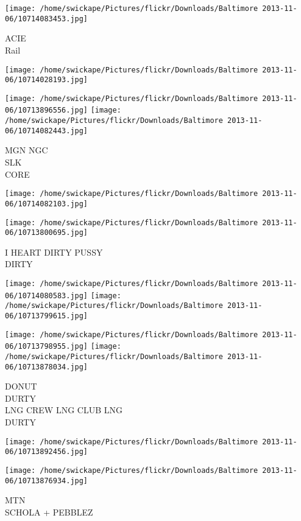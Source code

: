 \documentclass[10pt,letterpaper]{article}
\begin{document}
\vspace{0.25in}
\texttt{[image: /home/swickape/Pictures/flickr/Downloads/Baltimore 2013-11-06/10714083453.jpg]}

ACIE\\
Rail
\pagebreak

\texttt{[image: /home/swickape/Pictures/flickr/Downloads/Baltimore 2013-11-06/10714028193.jpg]}

\vspace{0.25in}
\texttt{[image: /home/swickape/Pictures/flickr/Downloads/Baltimore 2013-11-06/10713896556.jpg]}
\texttt{[image: /home/swickape/Pictures/flickr/Downloads/Baltimore 2013-11-06/10714082443.jpg]}

MGN NGC\\
SLK\\
CORE
\pagebreak

\texttt{[image: /home/swickape/Pictures/flickr/Downloads/Baltimore 2013-11-06/10714082103.jpg]}

\vspace{0.25in}
\texttt{[image: /home/swickape/Pictures/flickr/Downloads/Baltimore 2013-11-06/10713800695.jpg]}

I HEART DIRTY PUSSY\\
DIRTY
\pagebreak

\texttt{[image: /home/swickape/Pictures/flickr/Downloads/Baltimore 2013-11-06/10714080583.jpg]}
\texttt{[image: /home/swickape/Pictures/flickr/Downloads/Baltimore 2013-11-06/10713799615.jpg]}

\texttt{[image: /home/swickape/Pictures/flickr/Downloads/Baltimore 2013-11-06/10713798955.jpg]}
\texttt{[image: /home/swickape/Pictures/flickr/Downloads/Baltimore 2013-11-06/10713878034.jpg]}

DONUT\\
DURTY\\
LNG CREW LNG CLUB LNG\\
DURTY
\pagebreak

\texttt{[image: /home/swickape/Pictures/flickr/Downloads/Baltimore 2013-11-06/10713892456.jpg]}

\vspace{0.25in}
\texttt{[image: /home/swickape/Pictures/flickr/Downloads/Baltimore 2013-11-06/10713876934.jpg]}

MTN\\
SCHOLA + PEBBLEZ
\pagebreak
\end{document}
